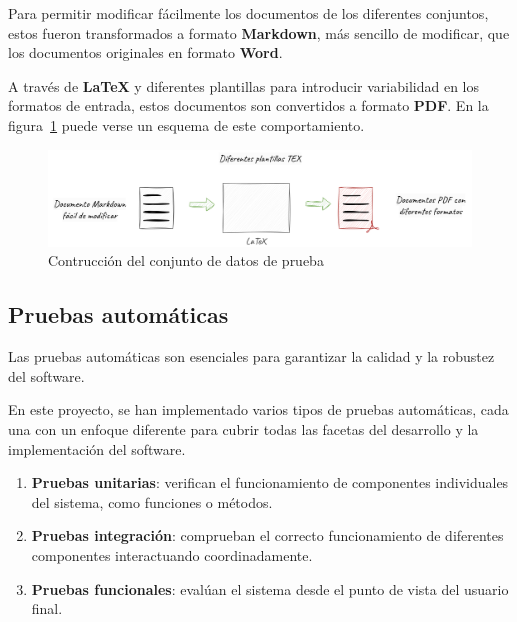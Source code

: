 Para permitir modificar fácilmente los documentos de los diferentes conjuntos, estos fueron transformados a formato
\textbf{Markdown}, más sencillo de modificar, que los documentos originales en formato \textbf{Word}.

A través de \textbf{LaTeX} y diferentes plantillas para introducir variabilidad en los formatos de entrada, estos
documentos son convertidos a formato \textbf{PDF}.
En la figura~\ref{fig:chapter_4.5.dataset_construction_overview} puede verse un esquema de este comportamiento.

\begin{figure}[ht]
    \begin{center}
        \includegraphics[width=\textwidth]{./chapter/4/images/chapter_4.5.dataset_construction_overview}
        \caption{Contrucción del conjunto de datos de prueba}
        \label{fig:chapter_4.5.dataset_construction_overview}
    \end{center}
\end{figure}


\subsection{Pruebas automáticas}

Las pruebas automáticas son esenciales para garantizar la calidad y la robustez del software.

En este proyecto, se han implementado varios tipos de pruebas automáticas, cada una con un enfoque diferente para cubrir
todas las facetas del desarrollo y la implementación del software.

\begin{enumerate}
    \item \textbf{Pruebas unitarias}: verifican el funcionamiento de componentes individuales del sistema, como
    funciones o métodos.
    \item \textbf{Pruebas integración}: comprueban el correcto funcionamiento de diferentes componentes
    interactuando coordinadamente.
    \item \textbf{Pruebas funcionales}: evalúan el sistema desde el punto de vista del usuario final.
\end{enumerate}


